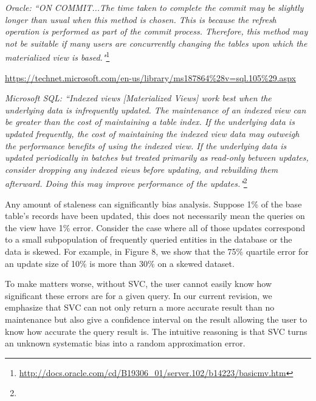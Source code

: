 \vspace{0.5em}

\emph{Oracle: ``ON COMMIT...The time taken to complete the commit may be slightly longer than usual when this method is chosen. This is because the refresh operation is performed as part of the commit process. Therefore, this method may not be suitable if many users are concurrently changing the tables upon which the materialized view is based."}\footnote{\url{http://docs.oracle.com/cd/B19306_01/server.102/b14223/basicmv.htm}}


\vspace{0.5em}

\urldef{\microsoft}\url{https://technet.microsoft.com/en-us/library/ms187864%28v=sql.105%29.aspx}

\emph{Microsoft SQL: ``Indexed views [Materialized Views] work best when the underlying data is infrequently updated. The maintenance of an indexed view can be greater than the cost of maintaining a table index. If the underlying data is updated frequently, the cost of maintaining the indexed view data may outweigh the performance benefits of using the indexed view. If the underlying data is updated periodically in batches but treated primarily as read-only between updates, consider dropping any indexed views before updating, and rebuilding them afterward. Doing this may improve performance of the updates."}\footnote{\microsoft}

\vspace{0.5em}

Any amount of staleness can significantly bias analysis. Suppose 1\% of the base table's records have been updated, this does not necessarily mean the queries on the view have 1\% error.  Consider the case where all of those updates correspond to a small subpopulation of frequently queried entities in the database or the data is skewed. For example, in Figure 8, we show that the 75\% quartile error for an update size of 10\% is more than 30\% on a skewed dataset.  

To make matters worse, without SVC, the user cannot easily know how significant these errors are for a given query. 
In our current revision, we emphasize that 
SVC can not only return a more accurate result than no maintenance but also give a confidence interval on the result allowing the user to know how accurate the query result is. The intuitive reasoning is that SVC turns an unknown systematic bias into a random approximation error.

